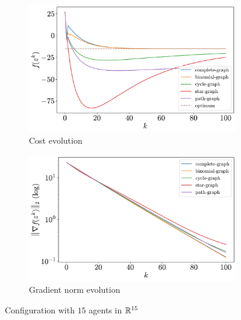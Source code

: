\documentclass[a4paper,11pt,oneside]{book}
\begin{document}
\begin{figure}[ht]
      \centering
      \begin{subfigure}[t]{0.49\textwidth}
            \centering
            \includegraphics[width=\linewidth]{./figs/quadratic/cost_15_15_100.pdf} 
            \caption{Cost evolution}
      \end{subfigure}
      \hfill
      \begin{subfigure}[t]{0.49\textwidth}
            \centering
            \includegraphics[width=\linewidth]{./figs/quadratic/gradient_15_15_100.pdf} 
            \caption{Gradient norm evolution}
      \end{subfigure}
      \caption{Configuration with $15$ agents in ${\mathbb{R}}^{15}$}
      \label{fig:quadratic_15_15}
\end{figure}
\end{document}
